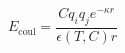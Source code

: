 \documentclass[12pt]{article}
\begin{document}
$$
 E_\text{coul} = \frac{ C q_i q_j e^{-\kappa r}}{\epsilon(T,C)r}
$$
\end{document}
